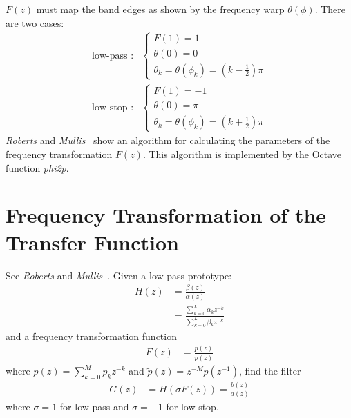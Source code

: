 \documentclass[a4paper,twoside,10pt,english]{report}
\begin{document}
$F\left(z\right)$ must map the band edges as shown by the frequency
warp $\theta\left(\phi\right)$. There are two cases:
\begin{align*}
\text{low-pass :} & \begin{cases}
F\left(1\right)=1\\
\theta\left(0\right)=0\\
\theta_{k}=\theta\left(\phi_{k}\right)=\left(k-\frac{1}{2}\right)\pi
\end{cases}
\end{align*}
\begin{align*}
\text{low-stop :} & \begin{cases}
F\left(1\right)=-1\\
\theta\left(0\right)=\pi\\
\theta_{k}=\theta\left(\phi_{k}\right)=\left(k+\frac{1}{2}\right)\pi
\end{cases}
\end{align*}
\emph{Roberts} and
\emph{Mullis}~\cite[Figure 6.7.3]{RobertsMullis_DigitalSignalProcessing} show
an algorithm for calculating the parameters of the frequency transformation
$F\left(z\right)$. This algorithm is implemented by the
Octave~\cite{Eaton_Octave} function \emph{phi2p}.
\section{Frequency Transformation of the Transfer Function}
See \emph{Roberts} and
\emph{Mullis}~\cite[Problem 6.26]{RobertsMullis_DigitalSignalProcessing}.
Given a low-pass prototype:
\begin{align*}
H\left(z\right) &= \frac{\beta\left(z\right)}{\alpha\left(z\right)}\\
 &= \frac{\sum_{k=0}^{L}\alpha_{k}z^{-k}}{\sum_{k=0}^{L}\beta_{k}z^{-k}}
\end{align*}
and a frequency transformation function
\begin{align*}
F\left(z\right) &= \frac{p\left(z\right)}{\tilde{p}\left(z\right)}
\end{align*}
where $p\left(z\right)=\sum_{k=0}^{M}p_{k}z^{-k}$ and $\tilde{p}\left(z\right)=z^{-M}p\left(z^{-1}\right)$,
find the filter
\begin{align*}
G\left(z\right) &= H\left(\sigma F\left(z\right)\right)=\frac{b\left(z\right)}{a\left(z\right)}
\end{align*}
where $\sigma=1$ for low-pass and $\sigma=-1$ for low-stop.
\end{document}
